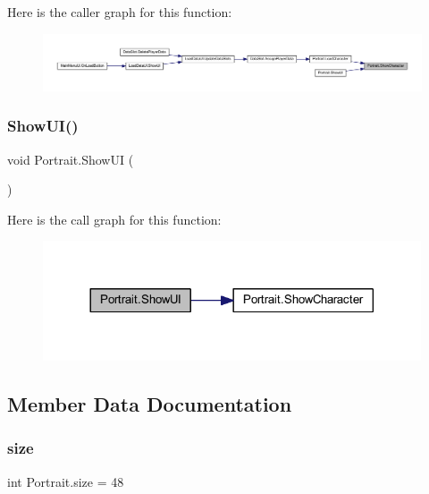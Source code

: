 Here is the caller graph for this function\+:\nopagebreak
\begin{figure}[H]
\begin{center}
\leavevmode
\includegraphics[width=350pt]{class_portrait_ab8365d52d39bacdb043a5f707e9c17ef_icgraph}
\end{center}
\end{figure}
\mbox{\label{class_portrait_a5469fe5b40d6ac458f87f2748cb0805c}} 
\subsubsection{\texorpdfstring{ShowUI()}{ShowUI()}}
{\footnotesize\ttfamily void Portrait.\+Show\+UI (\begin{DoxyParamCaption}{ }\end{DoxyParamCaption})}

Here is the call graph for this function\+:\nopagebreak
\begin{figure}[H]
\begin{center}
\leavevmode
\includegraphics[width=317pt]{class_portrait_a5469fe5b40d6ac458f87f2748cb0805c_cgraph}
\end{center}
\end{figure}


\subsection{Member Data Documentation}
\mbox{\label{class_portrait_ac8488582e058dc2d20b8f2e5bdfbe427}} 
\subsubsection{\texorpdfstring{size}{size}}
{\footnotesize\ttfamily int Portrait.\+size = 48\hspace{0.3cm}{\ttfamily [static]}}



